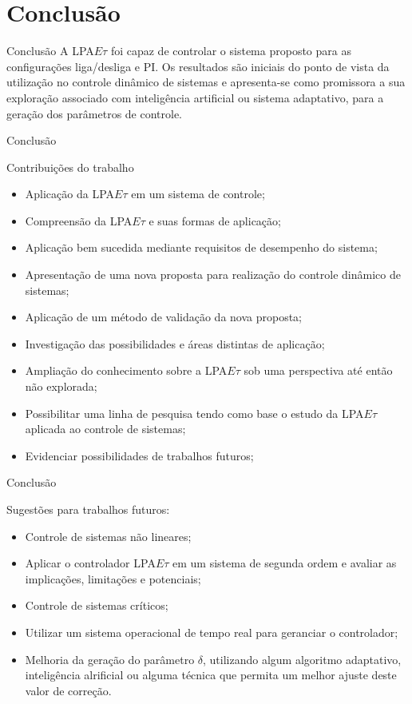 \section{Conclusão}


\begin{frame}{Conclusão}
  A LPA$E\tau$ foi capaz de controlar o sistema proposto para as configurações liga/desliga e PI.
  Os resultados são iniciais do ponto de vista da
  utilização no controle dinâmico de sistemas e apresenta-se como
  promissora a sua exploração associado com 
  inteligência artificial ou sistema adaptativo,
  para a geração dos parâmetros de controle.
\end{frame}






\begin{frame}{Conclusão}

Contribuições do trabalho
  
\begin{itemize}
\item Aplicação da LPA$E\tau$ em um sistema de controle;
\item Compreensão da LPA$E\tau$ e suas formas de aplicação;
\item Aplicação bem sucedida mediante requisitos de desempenho do sistema;
\item Apresentação de uma nova proposta para realização do controle dinâmico de sistemas;
\item Aplicação de um método de validação da nova proposta;
\item Investigação das possibilidades e áreas distintas de aplicação;
\item Ampliação do conhecimento sobre a LPA$E\tau$ sob uma perspectiva até então não explorada;
\item Possibilitar uma linha de pesquisa tendo como base o estudo da LPA$E\tau$ aplicada ao controle de sistemas;
\item Evidenciar possibilidades de trabalhos futuros;
  
\end{itemize}

\end{frame}


\begin{frame}{Conclusão}

Sugestões para trabalhos futuros:
  
\begin{itemize}
\item Controle de sistemas não lineares;
\item Aplicar o controlador LPA$E\tau$ em um sistema de segunda ordem e avaliar as implicações, limitações e potenciais;
\item Controle de sistemas críticos;
\item Utilizar um sistema operacional de tempo real para geranciar o controlador;
\item Melhoria da geração do parâmetro $\delta$, utilizando algum algoritmo adaptativo, inteligência alrificial ou alguma técnica que permita um melhor ajuste deste valor de correção.
\end{itemize}

\end{frame}
